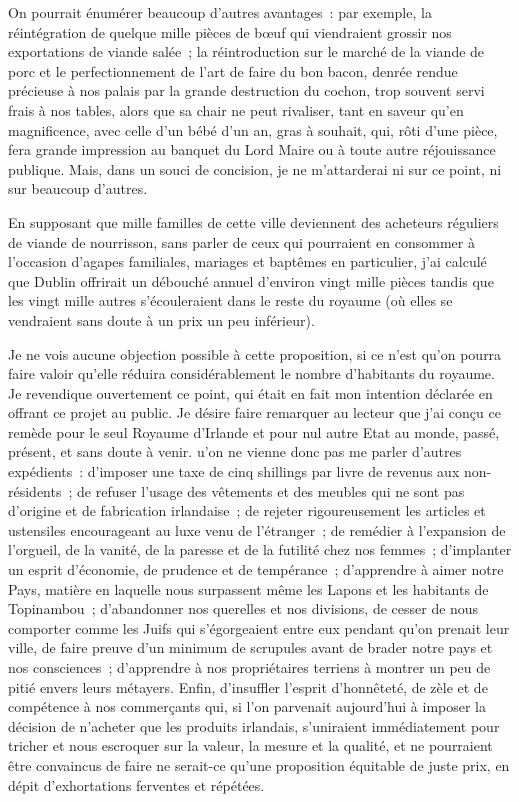 \documentclass[french,twoside]{book} %
\begin{document}
On pourrait énumérer beaucoup d’autres avantages : par exemple, la réintégration de quelque mille pièces de bœuf qui viendraient grossir nos exportations de viande salée ; la réintroduction sur le marché de la viande de porc et le perfectionnement de l’art de faire du bon bacon, denrée rendue précieuse à nos palais par la grande destruction du cochon, trop souvent servi frais à nos tables, alors que sa chair ne peut rivaliser, tant en saveur qu’en magnificence, avec celle d’un bébé d’un an, gras à souhait, qui, rôti d’une pièce, fera grande impression au banquet du Lord Maire ou à toute autre réjouissance publique. Mais, dans un souci de concision, je ne m’attarderai ni sur ce point, ni sur beaucoup d’autres.\par
En supposant que mille familles de cette ville deviennent des acheteurs réguliers de viande de nourrisson, sans parler de ceux qui pourraient en consommer à l’occasion d’agapes familiales, mariages et baptêmes en particulier, j’ai calculé que Dublin offrirait un débouché annuel d’environ vingt mille pièces tandis que les vingt mille autres s’écouleraient dans le reste du royaume (où elles se vendraient sans doute à un prix un peu inférieur).\par
Je ne vois aucune objection possible à cette proposition, si ce n’est qu’on pourra faire valoir qu’elle réduira considérablement le nombre d’habitants du royaume. Je revendique ouvertement ce point, qui était en fait mon intention déclarée en offrant ce projet au public. Je désire faire remarquer au lecteur que j’ai conçu ce remède pour le seul Royaume d’Irlande et pour nul autre Etat au monde, passé, présent, et sans doute à venir. u’on ne vienne donc pas me parler d’autres expédients : d’imposer une taxe de cinq shillings par livre de revenus aux non-résidents ; de refuser l’usage des vêtements et des meubles qui ne sont pas d’origine et de fabrication irlandaise ; de rejeter rigoureusement les articles et ustensiles encourageant au luxe venu de l’étranger ; de remédier à l’expansion de l’orgueil, de la vanité, de la paresse et de la futilité chez nos femmes ; d’implanter un esprit d’économie, de prudence et de tempérance ; d’apprendre à aimer notre Pays, matière en laquelle nous surpassent même les Lapons et les habitants de Topinambou ; d’abandonner nos querelles et nos divisions, de cesser de nous comporter comme les Juifs qui s’égorgeaient entre eux pendant qu’on prenait leur ville, de faire preuve d’un minimum de scrupules avant de brader notre pays et nos consciences ; d’apprendre à nos propriétaires terriens à montrer un peu de pitié envers leurs métayers. Enfin, d’insuffler l’esprit d’honnêteté, de zèle et de compétence à nos commerçants qui, si l’on parvenait aujourd’hui à imposer la décision de n’acheter que les produits irlandais, s’uniraient immédiatement pour tricher et nous escroquer sur la valeur, la mesure et la qualité, et ne pourraient être convaincus de faire ne serait-ce qu’une proposition équitable de juste prix, en dépit d’exhortations ferventes et répétées.\par
\end{document}
